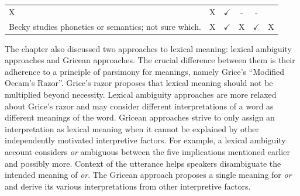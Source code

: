 \documentclass[oneside]{report}
\theoremstyle{definition}
\theoremstyle{definition}
\theoremstyle{definition}
\theoremstyle{remark}
\begin{document}
\begin{longtable}[]{@{}lccccc@{}}
\begin{minipage}[t]{0.05\columnwidth}
X\strut
\end{minipage} & \begin{minipage}[t]{0.05\columnwidth}\centering\strut
X\strut
\end{minipage} & \begin{minipage}[t]{0.05\columnwidth}\centering\strut
\(\checkmark\)\strut
\end{minipage} & \begin{minipage}[t]{0.09\columnwidth}\centering\strut
-\strut
\end{minipage} & \begin{minipage}[t]{0.12\columnwidth}\centering\strut
-\strut
\end{minipage}\tabularnewline
\begin{minipage}[t]{0.47\columnwidth}\raggedright\strut
Becky studies phonetics or semantics; not sure which.\strut
\end{minipage} & \begin{minipage}[t]{0.05\columnwidth}\centering\strut
X\strut
\end{minipage} & \begin{minipage}[t]{0.05\columnwidth}\centering\strut
\(\checkmark\)\strut
\end{minipage} & \begin{minipage}[t]{0.05\columnwidth}\centering\strut
X\strut
\end{minipage} & \begin{minipage}[t]{0.09\columnwidth}\centering\strut
\(\checkmark\)\strut
\end{minipage} & \begin{minipage}[t]{0.12\columnwidth}\centering\strut
X\strut
\end{minipage}\tabularnewline
\bottomrule
\end{longtable}
The chapter also discussed two approaches to lexical meaning: lexical
ambiguity approaches and Gricean approaches. The crucial difference
between them is their adherence to a principle of parsimony for
meanings, namely Grice's ``Modified Occam's Razor''. Grice's razor
proposes that lexical meaning should not be multiplied beyond necessity.
Lexical ambiguity approaches are more relaxed about Grice's razor and
may consider different interpretations of a word as different meanings
of the word. Gricean approaches strive to only assign an interpretation
as lexical meaning when it cannot be explained by other independently
motivated interpretive factors. For example, a lexical ambiguity account
considers \emph{or} ambiguous between the five implications mentioned
earlier and possibly more. Context of the utterance helps speakers
disambiguate the intended meaning of \emph{or}. The Gricean approach
proposes a single meaning for \emph{or} and derive its various
interpretations from other interpretive factors.
\end{document}
